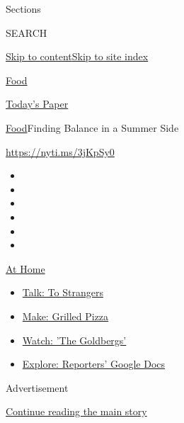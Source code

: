 Sections

SEARCH

\protect\hyperlink{site-content}{Skip to
content}\protect\hyperlink{site-index}{Skip to site index}

\href{https://www.nytimes.com/section/food}{Food}

\href{https://myaccount.nytimes.com/auth/login?response_type=cookie\&client_id=vi}{}

\href{https://www.nytimes.com/section/todayspaper}{Today's Paper}

\href{/section/food}{Food}\textbar{}Finding Balance in a Summer Side

\url{https://nyti.ms/3jKpSy0}

\begin{itemize}
\item
\item
\item
\item
\item
\item
\end{itemize}

\href{https://www.nytimes.com/spotlight/at-home?action=click\&pgtype=Article\&state=default\&region=TOP_BANNER\&context=at_home_menu}{At
Home}

\begin{itemize}
\tightlist
\item
  \href{https://www.nytimes.com/2020/08/03/well/family/the-benefits-of-talking-to-strangers.html?action=click\&pgtype=Article\&state=default\&region=TOP_BANNER\&context=at_home_menu}{Talk:
  To Strangers}
\item
  \href{https://www.nytimes.com/2020/08/01/at-home/coronavirus-make-pizza-on-a-grill.html?action=click\&pgtype=Article\&state=default\&region=TOP_BANNER\&context=at_home_menu}{Make:
  Grilled Pizza}
\item
  \href{https://www.nytimes.com/2020/07/31/arts/television/goldbergs-abc-stream.html?action=click\&pgtype=Article\&state=default\&region=TOP_BANNER\&context=at_home_menu}{Watch:
  'The Goldbergs'}
\item
  \href{https://www.nytimes.com/interactive/2020/at-home/even-more-reporters-editors-diaries-lists-recommendations.html?action=click\&pgtype=Article\&state=default\&region=TOP_BANNER\&context=at_home_menu}{Explore:
  Reporters' Google Docs}
\end{itemize}

Advertisement

\protect\hyperlink{after-top}{Continue reading the main story}

